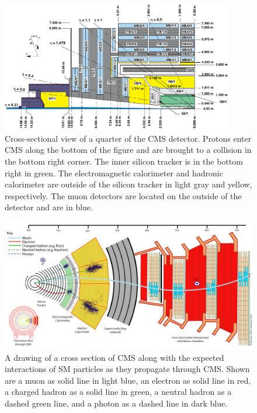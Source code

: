 \begin{figure}
  \begin{center}
      \includegraphics[clip=true, trim=0.0cm 0cm 3.0cm 0cm, width=0.9\textwidth]{figures/apparatus/CMS_LongView_noME42.pdf}
        \caption[Cross-section view of CMS detector]
        {Cross-sectional view of a quarter of the CMS detector. Protons enter CMS along the bottom of the figure and are brought to a collision in the bottom right corner.
The inner silicon tracker is in the bottom right in green. The electromagnetic calorimeter and hadronic calorimeter are outside of the silicon tracker
in light gray and yellow, respectively.
The muon detectors are located on the outside of the detector and are in blue.
         }
      \label{fig:CMSPart}
  \end{center}
\end{figure}

\begin{figure}
  \begin{center}
      \includegraphics[clip=true, trim=0.0cm 0cm 3.0cm 0cm, width=\textwidth]{figures/apparatus/CMS_Slice.png}
        \caption{A drawing of a cross section of CMS along with the expected interactions of SM particles as they propagate through CMS.
Shown are a muon as solid line in light blue, an electron as solid line in red, a charged hadron as a solid line in green, a neutral hadron as a dashed green line,
and a photon as a dashed line in dark blue.
        }
      \label{fig:CMSSlice}
  \end{center}
\end{figure}

